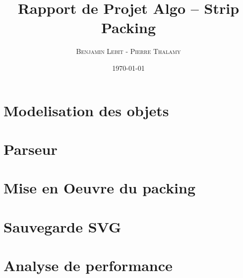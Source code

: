 \documentclass{article}
\title{Rapport de Projet Algo -- Strip Packing}
\author{\textsc{Benjamin Lebit} - \textsc{Pierre Thalamy}}
\date{\today}
\begin{document}
\maketitle

\section {Modelisation des objets}
\section {Parseur}
\section {Mise en Oeuvre du packing}
\section {Sauvegarde SVG}
\section {Analyse de performance}
\end{document}
